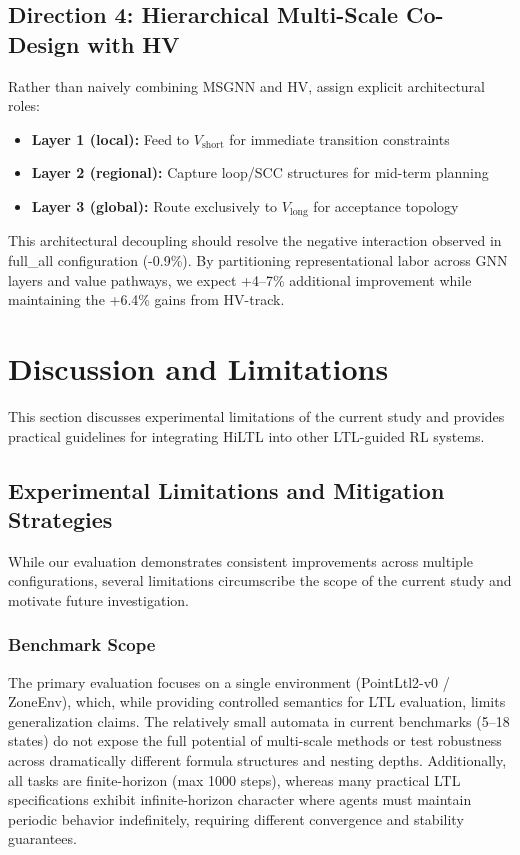 \documentclass{article}
\begin{document}
\subsection{Direction 4: Hierarchical Multi-Scale Co-Design with HV}

Rather than naively combining MSGNN and HV, assign explicit architectural roles:
\begin{itemize}
\item \textbf{Layer 1 (local):} Feed to $V_{\text{short}}$ for immediate transition constraints
\item \textbf{Layer 2 (regional):} Capture loop/SCC structures for mid-term planning
\item \textbf{Layer 3 (global):} Route exclusively to $V_{\text{long}}$ for acceptance topology
\end{itemize}

This architectural decoupling should resolve the negative interaction observed in full\_all configuration (-0.9\%). By partitioning representational labor across GNN layers and value pathways, we expect +4--7\% additional improvement while maintaining the +6.4\% gains from HV-track.


\section{Discussion and Limitations}
\label{app:discussion}

This section discusses experimental limitations of the current study and provides practical guidelines for integrating HiLTL into other LTL-guided RL systems.

\subsection{Experimental Limitations and Mitigation Strategies}
\label{app:limitations}

While our evaluation demonstrates consistent improvements across multiple configurations, several limitations circumscribe the scope of the current study and motivate future investigation.

\subsubsection{Benchmark Scope}

The primary evaluation focuses on a single environment (PointLtl2-v0 / ZoneEnv), which, while providing controlled semantics for LTL evaluation, limits generalization claims. The relatively small automata in current benchmarks (5--18 states) do not expose the full potential of multi-scale methods or test robustness across dramatically different formula structures and nesting depths. Additionally, all tasks are finite-horizon (max 1000 steps), whereas many practical LTL specifications exhibit infinite-horizon character where agents must maintain periodic behavior indefinitely, requiring different convergence and stability guarantees.
\end{document}
